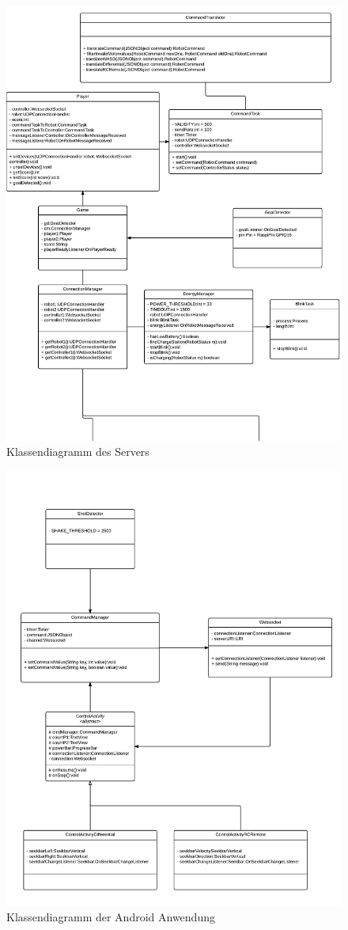 \begin{figure}[h]
	\includegraphics[page=2,width=\textwidth]{images/uml_software_all.pdf}
	
	\caption{Klassendiagramm des Servers}
	\label{fig:server_uml_all}
\end{figure}


\begin{figure}[h]
	\includegraphics[width=\textwidth]{images/uml_android_app.pdf}
	\caption{Klassendiagramm der Android Anwendung}
	\label{fig:android_uml}
\end{figure}